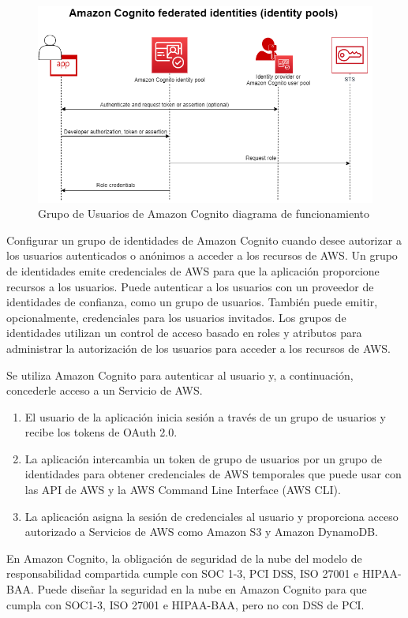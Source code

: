 \begin{figure}[h]
\centering
\includegraphics[width=.75\textwidth]{imagenes/ac_fed_pool.png}
\caption{Grupo de Usuarios de Amazon Cognito diagrama de funcionamiento}
\end{figure}

Configurar un grupo de identidades de Amazon Cognito cuando desee autorizar a los usuarios autenticados o anónimos a acceder a los recursos de AWS. Un grupo de identidades emite credenciales de AWS para que la aplicación proporcione recursos a los usuarios. Puede autenticar a los usuarios con un proveedor de identidades de confianza, como un grupo de usuarios. También puede emitir, opcionalmente, credenciales para los usuarios invitados. Los grupos de identidades utilizan un control de acceso basado en roles y atributos para administrar la autorización de los usuarios para acceder a los recursos de AWS.

Se utiliza Amazon Cognito para autenticar al usuario y, a continuación, concederle acceso a un Servicio de AWS.
\begin{enumerate}
\item El usuario de la aplicación inicia sesión a través de un grupo de usuarios y recibe los tokens de OAuth 2.0.
\item La aplicación intercambia un token de grupo de usuarios por un grupo de identidades para obtener credenciales de AWS temporales que puede usar con las API de AWS y la AWS Command Line Interface (AWS CLI).
\item La aplicación asigna la sesión de credenciales al usuario y proporciona acceso autorizado a Servicios de AWS como Amazon S3 y Amazon DynamoDB.
\end{enumerate}

En Amazon Cognito, la obligación de seguridad de la nube del modelo de responsabilidad compartida cumple con SOC 1-3, PCI DSS, ISO 27001 e HIPAA-BAA. Puede diseñar la seguridad en la nube en Amazon Cognito para que cumpla con SOC1-3, ISO 27001 e HIPAA-BAA, pero no con DSS de PCI. 


